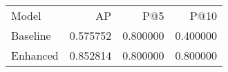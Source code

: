 \begin{tabular}{lrrr}
Model & AP & P@5 & P@10 \\
Baseline & 0.575752 & 0.800000 & 0.400000 \\
Enhanced & 0.852814 & 0.800000 & 0.800000 \\
\end{tabular}
